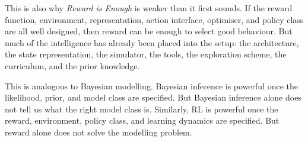 \documentclass{article}
\begin{document}
This is also why \emph{Reward is Enough} is weaker than it first sounds. If the reward function, environment, representation, action interface, optimiser, and policy class are all well designed, then reward can be enough to select good behaviour. But much of the intelligence has already been placed into the setup: the architecture, the state representation, the simulator, the tools, the exploration scheme, the curriculum, and the prior knowledge.

This is analogous to Bayesian modelling. Bayesian inference is powerful once the likelihood, prior, and model class are specified. But Bayesian inference alone does not tell us what the right model class is. Similarly, RL is powerful once the reward, environment, policy class, and learning dynamics are specified. But reward alone does not solve the modelling problem.
\end{document}

